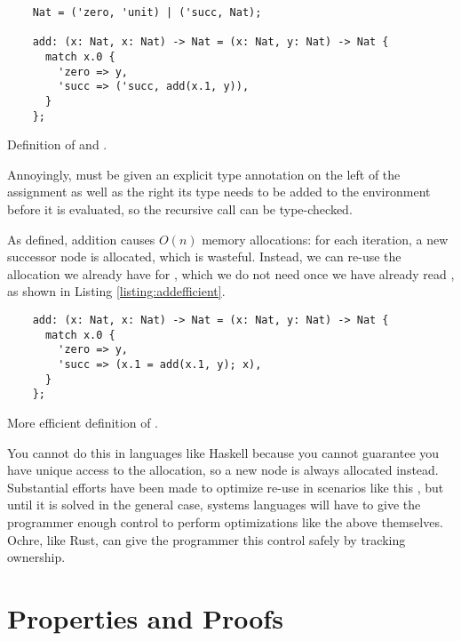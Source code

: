 \documentclass[12pt,twoside]{report}
\begin{document}
\begin{listing}
  \begin{verbatim}
    Nat = ('zero, 'unit) | ('succ, Nat);

    add: (x: Nat, x: Nat) -> Nat = (x: Nat, y: Nat) -> Nat {
      match x.0 {
        'zero => y,
        'succ => ('succ, add(x.1, y)),
      }
    };
  \end{verbatim}
  \caption{Definition of  and .}
  \label{listing:natadd}
\end{listing}

Annoyingly,  must be given an explicit type annotation on the left of the assignment as well as the right its type needs to be added to the environment before it is evaluated, so the recursive call can be type-checked.

As defined, addition causes $O(n)$ memory allocations: for each iteration, a new successor node is allocated, which is wasteful. Instead, we can re-use the allocation we already have for , which we do not need once we have already read , as shown in Listing \ref{listing:addefficient}.

\begin{listing}
  \begin{verbatim}
    add: (x: Nat, x: Nat) -> Nat = (x: Nat, y: Nat) -> Nat {
      match x.0 {
        'zero => y,
        'succ => (x.1 = add(x.1, y); x),
      }
    };
  \end{verbatim}
  \caption{More efficient definition of .}
  \label{listing:natadd}
\end{listing}

You cannot do this in languages like Haskell because you cannot guarantee you have unique access to the allocation, so a new node is always allocated instead. Substantial efforts have been made to optimize re-use in scenarios like this \citep{ningningPerceusGarbageFree2021}, but until it is solved in the general case, systems languages will have to give the programmer enough control to perform optimizations like the above themselves. Ochre, like Rust, can give the programmer this control safely by tracking ownership.


\section{Properties and Proofs}
\label{section:properties}
\end{document}
